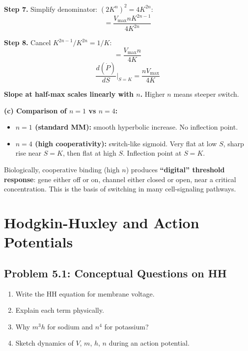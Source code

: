 \documentclass[10pt]{article}
\begin{document}
\begin{solution}
\textbf{Step 7.} Simplify denominator: $(2K^n)^2 = 4K^{2n}$:
\[
= \frac{V_{\max}n K^{2n-1}}{4K^{2n}}
\]

\textbf{Step 8.} Cancel $K^{2n-1}/K^{2n} = 1/K$:
\[
= \frac{V_{\max}n}{4K}
\]
\[
\boxed{\frac{d(\dot P)}{dS}\bigg|_{S=K} = \frac{nV_{\max}}{4K}}
\]

\textbf{Slope at half-max scales linearly with $n$.} Higher $n$ means steeper switch.

\medskip\textbf{(c) Comparison of $n=1$ vs $n=4$:}

\begin{itemize}
\item \textbf{$n=1$ (standard MM):} smooth hyperbolic increase. No inflection point.
\item \textbf{$n=4$ (high cooperativity):} switch-like sigmoid. Very flat at low $S$, sharp rise near $S = K$, then flat at high $S$. Inflection point at $S = K$.
\end{itemize}

Biologically, cooperative binding (high $n$) produces \textbf{``digital'' threshold response}: gene either off or on, channel either closed or open, near a critical concentration. This is the basis of switching in many cell-signaling pathways.
\end{solution}

\newpage
\section{Hodgkin-Huxley and Action Potentials}

\subsection{Problem 5.1: Conceptual Questions on HH}

\begin{problem}
\begin{enumerate}[label=(\alph*)]
\item Write the HH equation for membrane voltage.
\item Explain each term physically.
\item Why $m^3 h$ for sodium and $n^4$ for potassium?
\item Sketch dynamics of $V$, $m$, $h$, $n$ during an action potential.
\end{enumerate}
\end{problem}
\end{document}
